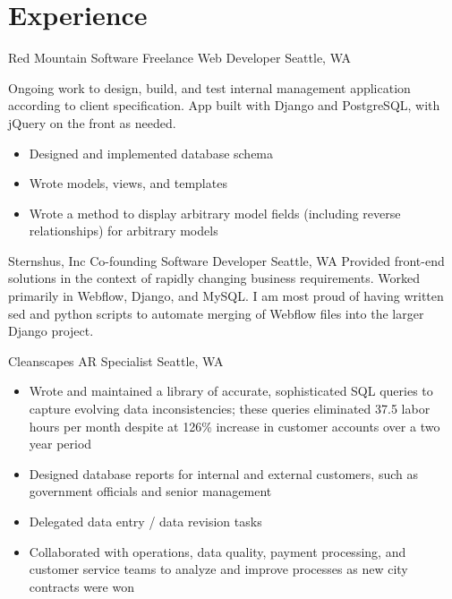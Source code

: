 \documentclass[10pt,a4paper,sans]{moderncv}        %
\begin{document}
\section{Experience}

\begin{comment}
  \cventry
  {date - date}
  {Employer}
  {Job Title}
  {}
  {City, State}
  {Description of work
    \begin{itemize}
    \item specific achievement
    \item specific achievement
    \end{itemize}}
\end{comment}

 {Red Mountain Software} {Freelance Web Developer}
{} {Seattle, WA} {Ongoing work to design, build, and test internal management
  application according to client specification. App built with Django and
  PostgreSQL, with jQuery on the front as needed.
  \begin{itemize}
  \item Designed and implemented database schema
  \item Wrote models, views, and templates
  \item Wrote a method to display arbitrary model fields (including reverse
    relationships) for arbitrary models
  \end{itemize}}

 {Sternshus, Inc} {Co-founding Software Developer}
{} {Seattle, WA} {Provided front-end solutions in the context of rapidly
  changing business requirements. Worked primarily in Webflow, Django, and
  MySQL. I am most proud of having written sed and python scripts to automate
  merging of Webflow files into the larger Django project.}

 {Cleanscapes} {AR Specialist} {} {Seattle, WA} {
  \begin{itemize}
  \item Wrote and maintained a library of accurate, sophisticated SQL queries
    to capture evolving data inconsistencies; these queries eliminated 37.5
    labor hours per month despite at 126\% increase in customer accounts over
    a two year period
  \item Designed database reports for internal and external customers, such as
    government officials and senior management
  \item Delegated data entry / data revision tasks
  \item Collaborated with operations, data quality, payment processing, and
    customer service teams to analyze and improve processes as new city
    contracts were won
  \end{itemize}}
\end{document}
